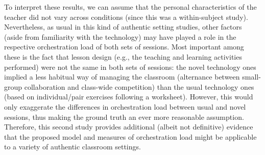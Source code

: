 \documentclass[10pt,journal,compsoc]{IEEEtran}
\begin{document}
To interpret these results, we can assume that the personal characteristics of the teacher did not vary across conditions (since this was a within-subject study). Nevertheless, as usual in this kind of authentic setting studies, other factors (aside from familiarity with the technology) may have played a role in the respective orchestration load of both sets of sessions. Most important among these is the fact that lesson design (e.g., the teaching and learning activities performed) were not the same in both sets of sessions: the novel technology ones implied a less habitual way of managing the classroom (alternance between small-group collaboration and class-wide competition) than the usual technology ones (based on individual/pair exercises following a worksheet). However, this would only exaggerate the differences in orchestration load between usual and novel sessions, thus making the ground truth an ever more reasonable assumption. Therefore, this second study provides additional (albeit not definitive) evidence that the proposed model and measures of orchestration load might be applicable to a variety of authentic classroom settings.

\end{document}

